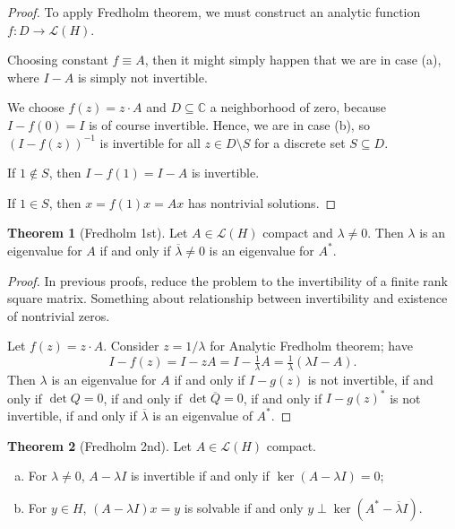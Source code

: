 \documentclass[12pt]{article}
\theoremstyle{definition}
\newtheorem{theorem}{Theorem}
\newcommand{\C}{\mathbb{C}}
\newcommand{\LL}{\mathcal{L}}
\newcommand{\<}{\left\langle}
\renewcommand{\>}{\right\rangle}
\newcommand{\seq}{\subseteq}
\newcommand{\conj}{\overline}
\begin{document}
\begin{proof}
    To apply Fredholm theorem, we must construct an analytic function $f : D \to \LL(H)$.
    
    Choosing constant $f \equiv A$, then it might simply happen that we are in case (a), where $I - A$ is simply not invertible.

    We choose $f(z) = z \cdot A$ and $D \seq \C$ a neighborhood of zero, because $I - f(0) = I$ is of course invertible.
    Hence, we are in case (b), so $(I - f(z))^{-1}$ is invertible for all $z \in D \setminus S$ for a discrete set $S \seq D$.

    If $1 \notin S$, then $I - f(1) = I - A$ is invertible.
    
    If $1 \in S$, then $x = f(1)x = Ax$ has nontrivial solutions.
\end{proof}

\begin{theorem}[Fredholm 1st]
    Let $A \in \LL(H)$ compact and $\lambda \ne 0$.
    Then $\lambda$ is an eigenvalue for $A$ if and only if $\conj{\lambda} \ne 0$ is an eigenvalue for $A^*$.
\end{theorem}

\begin{proof}
    In previous proofs, reduce the problem to the invertibility of a finite rank square matrix.
    Something about relationship between invertibility and existence of nontrivial zeros.

    Let $f(z) = z \cdot A$.
    Consider $z = 1/\lambda$ for Analytic Fredholm theorem; have
    \[
        I - f(z)
            = I - zA
            = I - \tfrac{1}{\lambda}A
            = \tfrac{1}{\lambda}(\lambda I - A).
    \]
    Then $\lambda$ is an eigenvalue for $A$ if and only if $I - g(z)$ is not invertible, if and only if $\det Q = 0$, if and only if $\det \conj{Q} = 0$, if and only if $I - g(z)^*$ is not invertible, if and only if $\conj{\lambda}$ is an eigenvalue of $A^*$.
\end{proof}

\begin{theorem}[Fredholm 2nd]
    Let $A \in \LL(H)$ compact.
    \begin{enumerate}[(a)]
        \item For $\lambda \ne 0$, $A - \lambda I$ is invertible if and only if $\ker(A - \lambda I) = 0$;
        \item For $y \in H$, $(A - \lambda I)x = y$ is solvable if and only $y \perp \ker(A^* - \conj{\lambda}I)$.
    \end{enumerate}
\end{theorem}
\end{document}
